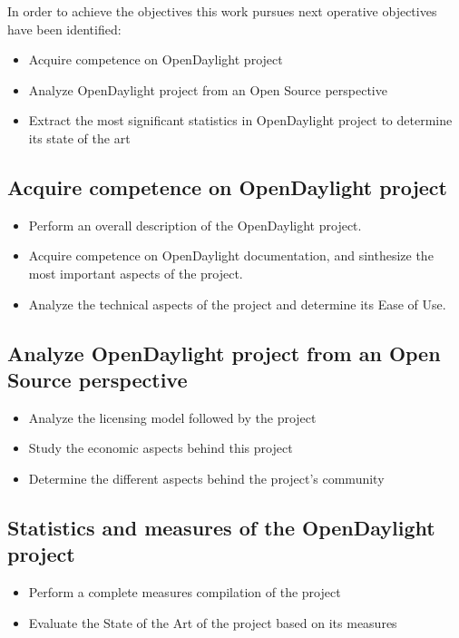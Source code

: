 \documentclass[a4paper, 12pt]{book}
\begin{document}
In order to achieve the objectives this work pursues next operative objectives have been identified:

\begin{itemize}
\item{Acquire competence on OpenDaylight project}
\item{Analyze OpenDaylight project from an Open Source perspective}
\item{Extract the most significant statistics in OpenDaylight project to determine its state of the art}
\end{itemize}

\subsection{Acquire competence on OpenDaylight project}
\begin{itemize}
 \item Perform an overall description of the OpenDaylight project.
 \item Acquire competence on OpenDaylight documentation, and sinthesize the most important aspects of the project.
 \item Analyze the technical aspects of the project and determine its Ease of Use.
\end{itemize}

\subsection{Analyze OpenDaylight project from an Open Source perspective}
\begin{itemize}
 \item Analyze the licensing model followed by the project
 \item Study the economic aspects behind this project
 \item Determine the different aspects behind the project's community
\end{itemize}

\subsection{Statistics and measures of the OpenDaylight project}
\begin{itemize}
 \item Perform a complete measures compilation of the project
 \item Evaluate the State of the Art of the project based on its measures
\end{itemize}
\end{document}
